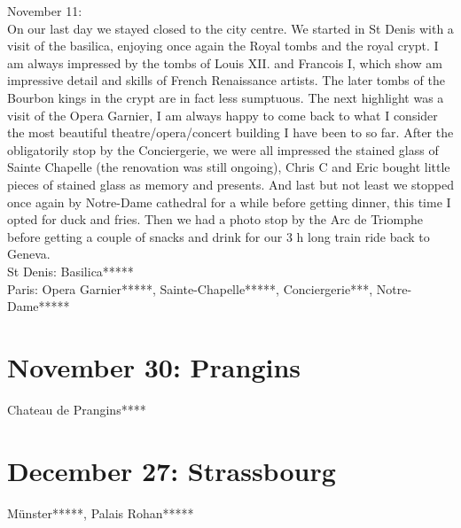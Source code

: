 November 11:\\
On our last day we stayed closed to the city centre. We started in St Denis with a visit of the basilica, enjoying once again the Royal tombs and the royal crypt. I am always impressed by the tombs of Louis XII. and Francois I, which show am impressive detail and skills of French Renaissance artists. The later tombs of the Bourbon kings in the crypt are in fact less sumptuous. The next highlight was a visit of the Opera Garnier, I am always happy to come back to what I consider the most beautiful theatre/opera/concert building I have been to so far. After the obligatorily stop by the Conciergerie, we were all impressed the stained glass of Sainte Chapelle (the renovation was still ongoing), Chris C and Eric bought little pieces of stained glass as memory and presents. And last but not least we stopped once again by Notre-Dame cathedral for a while before getting dinner, this time I opted for duck and fries. Then we had a photo stop by the Arc de Triomphe before getting a couple of snacks and drink for our 3 h long train ride back to Geneva.\\

St Denis: Basilica*****\\
Paris: Opera Garnier*****, Sainte-Chapelle*****, Conciergerie***, Notre-Dame*****

\section{November 30: Prangins}
\label{2013:Prangins}

Chateau de Prangins****

\section{December 27: Strassbourg}
\label{2013Strassbourg}

M\"unster*****, Palais Rohan*****